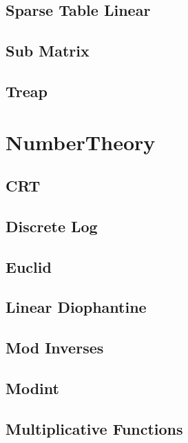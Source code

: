 \subsection{Sparse Table Linear}
\raggedbottom
\hrulefill
\subsection{Sub Matrix}
\raggedbottom
\hrulefill
\subsection{Treap}
\raggedbottom
\hrulefill
\newpage

\section{NumberTheory}
\subsection{CRT}
\raggedbottom
\hrulefill
\subsection{Discrete Log}
\raggedbottom
\hrulefill
\subsection{Euclid}
\raggedbottom
\hrulefill
\subsection{Linear Diophantine}
\raggedbottom
\hrulefill
\subsection{Mod Inverses}
\raggedbottom
\hrulefill
\subsection{Modint}
\raggedbottom
\hrulefill
\subsection{Multiplicative Functions}
\raggedbottom
\hrulefill
